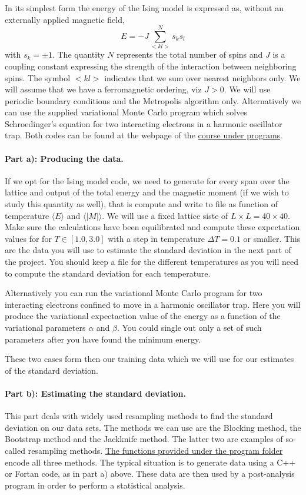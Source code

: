 \documentclass[%
oneside,                 %
final,                   %
10pt]{article}
\begin{document}
In its simplest form
the energy of the Ising model is expressed as, without an externally applied magnetic field, 
\[
E=-J\sum_{< kl >}^{N}s_ks_l 
\]
with
$s_k=\pm 1$. The quantity $N$ represents the total number of spins and $J$ is a coupling
constant expressing the strength of the interaction between
neighboring spins.  The symbol $<kl>$ indicates that we sum over
nearest neighbors only. We will assume that we have a ferromagnetic
ordering, viz $J> 0$.  We will use periodic boundary conditions and
the Metropolis algorithm only. Alternatively we can use the supplied variational Monte Carlo program which solves Schroedinger's equation for two interacting electrons in a harmonic oscillator trap. Both codes can be found at the webpage of the \href{{https://github.com/CompPhysics/MachineLearning/tree/master/doc/Programs/}}{course under programs}. 

\paragraph{Part a): Producing the data.}
If we opt for the Ising model code, we need to generate for every span over the lattice and output of the total energy and the magnetic moment (if we wish to study this quantity as well), that is compute and write to file as function of temperature
$\langle E\rangle$ and $\langle \vert M\vert \rangle$.
We will use a fixed lattice siste of $L\times L = 40 \times 40$. Make sure the calculations have been equilibrated and compute these expectation values for 
for $T\in [1.0,3.0]$ with a step in
temperature $\Delta T=0.1$ or smaller.  This are the data you will use to estimate the standard deviation in the next part of the project.
You should keep a file for the different temperatures as you will need to compute the standard deviation for each temperature. 


Alternatively you can run the variational Monte Carlo program for two interacting electrons confined to move in a harmonic oscillator trap. Here you will produce the variational expectaction value of the energy as a function of the variational parameters $\alpha$ and $\beta$. You could single out only a set of such parameters after you have found the minimum energy. 

These two cases form then our training data which we will use  for our estimates of the standard deviation.


\paragraph{Part b): Estimating the standard deviation.}
This part deals with widely used resampling methods to find the standard deviation on our data sets. The methods we can use are the Blocking method, the Bootstrap method and the Jackknife method. The latter two are examples of so-called resampling methods. \href{{https://github.com/CompPhysics/MachineLearning/tree/master/doc/Programs/Sampling}}{The functions provided under the program folder} encode all three methods. The typical situation is to generate data using a C++ or Fortan code, as in part a) above. These data are then used by a post-analysis program in order to perform a statistical analysis. 
\end{document}
